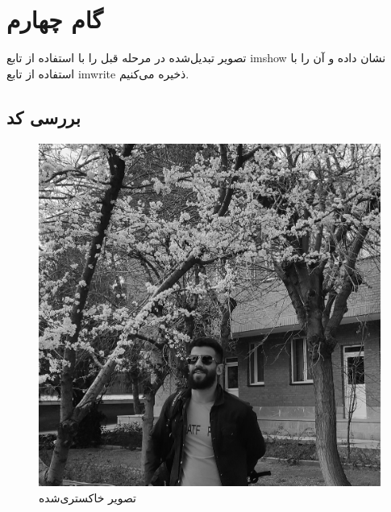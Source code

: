 \section{گام چهارم}
تصویر تبدیل‌شده در مرحله قبل را با استفاده از تابع
imshow
نشان داده و آن را با استفاده از تابع
imwrite
ذخیره می‌کنیم.
\subsection{بررسی کد}
\lr{}
\begin{figure}[H]
    \centering
    \includegraphics[width=0.65\linewidth]{images/GrayImage.jpg}
    \caption{تصویر خاکستری‌شده  }
    \label{fig:h}
\end{figure}

